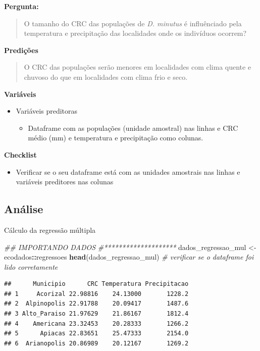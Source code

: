 \documentclass[
]{book}
\newenvironment{Shaded}{\begin{snugshade}}{\end{snugshade}}
\newcommand{\CommentTok}[1]{\textcolor[rgb]{0.56,0.35,0.01}{\textit{#1}}}
\newcommand{\KeywordTok}[1]{\textcolor[rgb]{0.13,0.29,0.53}{\textbf{#1}}}
\newcommand{\NormalTok}[1]{#1}
\newcommand{\OperatorTok}[1]{\textcolor[rgb]{0.81,0.36,0.00}{\textbf{#1}}}
\newcommand{\StringTok}[1]{\textcolor[rgb]{0.31,0.60,0.02}{#1}}
\providecommand{\tightlist}{%
  \setlength{\itemsep}{0pt}\setlength{\parskip}{0pt}}
\begin{document}
\textbf{Pergunta:}

\begin{quote}
O tamanho do CRC das populações de \emph{D. minutus} é influênciado pela temperatura e precipitação das localidades onde os indivíduos ocorrem?
\end{quote}

\textbf{Predições}

\begin{quote}
O CRC das populações serão menores em localidades com clima quente e chuvoso do que em localidades com clima frio e seco.
\end{quote}

\textbf{Variáveis}

\begin{itemize}
\tightlist
\item
  Variáveis preditoras

  \begin{itemize}
  \tightlist
  \item
    Dataframe com as populações (unidade amostral) nas linhas e CRC médio (mm) e temperatura e precipitação como colunas.
  \end{itemize}
\end{itemize}

\textbf{Checklist}

\begin{itemize}
\tightlist
\item
  Verificar se o seu dataframe está com as unidades amostrais nas linhas e variáveis preditores nas colunas
\end{itemize}

\hypertarget{anuxe1lise-5}{%
\subsection{Análise}\label{anuxe1lise-5}}

Cálculo da regressão múltipla

\begin{Shaded}
\begin{Highlighting}[]
\CommentTok{## IMPORTANDO DADOS}
\CommentTok{#********************}
\NormalTok{dados_regressao_mul <-}\StringTok{ }\NormalTok{ecodados}\OperatorTok{::}\NormalTok{regressoes}
\KeywordTok{head}\NormalTok{(dados_regressao_mul) }\CommentTok{# verificar se o dataframe foi lido corretamente}
\end{Highlighting}
\end{Shaded}

\begin{verbatim}
##      Municipio      CRC Temperatura Precipitacao
## 1     Acorizal 22.98816    24.13000       1228.2
## 2  Alpinopolis 22.91788    20.09417       1487.6
## 3 Alto_Paraiso 21.97629    21.86167       1812.4
## 4    Americana 23.32453    20.28333       1266.2
## 5      Apiacas 22.83651    25.47333       2154.0
## 6  Arianopolis 20.86989    20.12167       1269.2
\end{verbatim}
\end{document}
